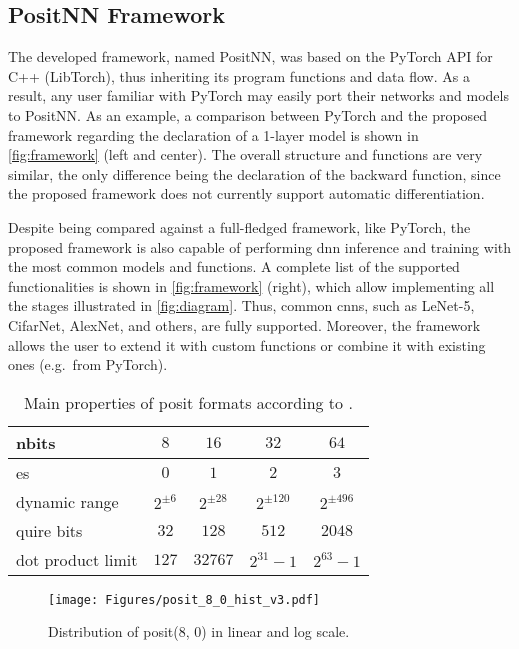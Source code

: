 \documentclass{article}
\begin{document}
	\subsection{PositNN Framework}
	
	The developed framework, named PositNN, was based on the PyTorch API for C++ (LibTorch), thus inheriting its program functions and data flow. As a result, any user familiar with PyTorch may easily port their networks and models to PositNN. As an example, a comparison between PyTorch and the proposed framework regarding the declaration of a 1-layer model is shown in \cref{fig:framework} (left and center). The overall structure and functions are very similar, the only difference being the declaration of the backward function, since the proposed framework does not currently support automatic differentiation.
	
	Despite being compared against a full-fledged framework, like PyTorch, the proposed framework is also capable of performing \gls{dnn} inference and training with the most common models and functions. A complete list of the supported functionalities is shown in \cref{fig:framework} (right), which allow implementing all the stages illustrated in \cref{fig:diagram}. Thus, common \glspl{cnn}, such as LeNet-5, CifarNet, AlexNet, and others, are fully supported. Moreover, the framework allows the user to extend it with custom functions or combine it with existing ones (e.g.\ from PyTorch).
	
	\begin{table}[t]
		\vspace*{-0.5\baselineskip}
		\centering
		\caption{Main properties of posit formats according to \cite{Group2018}.}
		\label{tab:posit_quire}
		\begin{tabular}{@{}lcccc@{}}
			\toprule
			nbits & $8$ & $16$ & $32$ & $64$ \\ \midrule
			es & $0$ & $1$ & $2$ & $3$ \\
			dynamic range & $2^{\pm 6}$ & $2^{\pm 28}$ & $2^{\pm 120}$ & $2^{\pm 496}$ \\
			quire bits & $32$ & $128$ & $512$ & $2048$ \\
			dot product limit & $127$ & $32767$ & $2^{31}-1$ & $2^{63}-1$ \\ \bottomrule
		\end{tabular}
	\end{table}        
	\begin{figure}[t]
		\centering
		\texttt{[image: Figures/posit\_8\_0\_hist\_v3.pdf]}
		\vspace*{-1.5\baselineskip}
		\caption{Distribution of posit(8, 0) in linear and log scale.}
		\vspace*{-0.5\baselineskip}
		\label{fig:posit_distribution}
	\end{figure}
	
\end{document}
